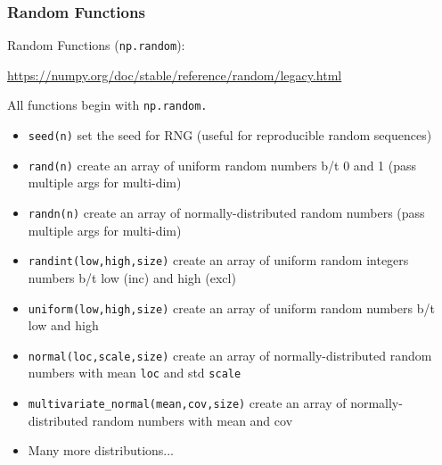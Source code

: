 \documentclass{beamer}
\newcommand{\code}[1]{\texttt{#1}}
\begin{document}
\begin{frame}	
	\frametitle{Random Functions}
	
	\begin{block}{Random Functions (\code{np.random}):}
		\begin{scriptsize}
		\href{https://numpy.org/doc/stable/reference/random/legacy.html}{https://numpy.org/doc/stable/reference/random/legacy.html}
		
		\vspace{10PT}
		All functions begin with \code{np.random.}
		\begin{itemize}
			\item \code{seed(n)} set the seed for RNG (useful for reproducible random sequences)
			\item \code{rand(n)} create an array of uniform random numbers b/t 0 and 1 (pass multiple args for multi-dim)
			\item \code{randn(n)} create an array of normally-distributed random numbers (pass multiple args for multi-dim)
			\item \code{randint(low,high,size)} create an array of uniform random integers numbers b/t low (inc) and high (excl)
			\item \code{uniform(low,high,size)} create an array of uniform random numbers b/t low and high
			\item \code{normal(loc,scale,size)} create an array of normally-distributed random numbers with mean \code{loc} and std \code{scale}
			\item \code{multivariate\_normal(mean,cov,size)} create an array of normally-distributed random numbers with mean and cov
			\item Many more distributions...
		\end{itemize}
		\end{scriptsize}
	\end{block}
	
\end{frame}
\end{document}
